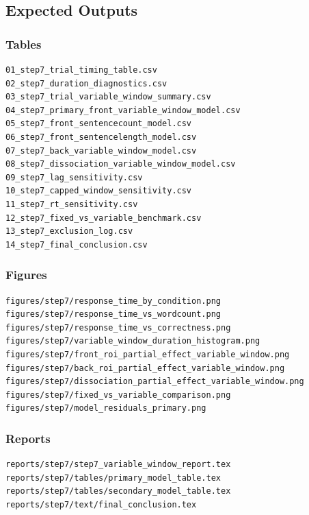 \documentclass[11pt]{article}
\begin{document}
\subsection{Expected Outputs}

\subsubsection*{Tables}
\begin{verbatim}
01_step7_trial_timing_table.csv
02_step7_duration_diagnostics.csv
03_step7_trial_variable_window_summary.csv
04_step7_primary_front_variable_window_model.csv
05_step7_front_sentencecount_model.csv
06_step7_front_sentencelength_model.csv
07_step7_back_variable_window_model.csv
08_step7_dissociation_variable_window_model.csv
09_step7_lag_sensitivity.csv
10_step7_capped_window_sensitivity.csv
11_step7_rt_sensitivity.csv
12_step7_fixed_vs_variable_benchmark.csv
13_step7_exclusion_log.csv
14_step7_final_conclusion.csv
\end{verbatim}

\subsubsection*{Figures}
\begin{verbatim}
figures/step7/response_time_by_condition.png
figures/step7/response_time_vs_wordcount.png
figures/step7/response_time_vs_correctness.png
figures/step7/variable_window_duration_histogram.png
figures/step7/front_roi_partial_effect_variable_window.png
figures/step7/back_roi_partial_effect_variable_window.png
figures/step7/dissociation_partial_effect_variable_window.png
figures/step7/fixed_vs_variable_comparison.png
figures/step7/model_residuals_primary.png
\end{verbatim}

\subsubsection*{Reports}
\begin{verbatim}
reports/step7/step7_variable_window_report.tex
reports/step7/tables/primary_model_table.tex
reports/step7/tables/secondary_model_table.tex
reports/step7/text/final_conclusion.tex
\end{verbatim}
\end{document}
